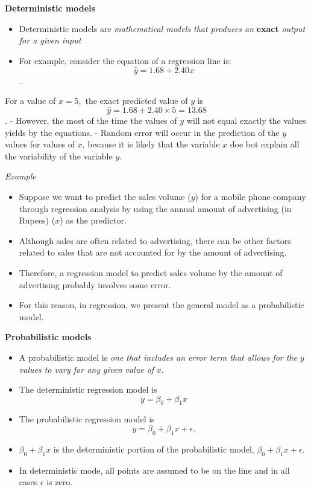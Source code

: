\documentclass[]{book}
\providecommand{\tightlist}{%
  \setlength{\itemsep}{0pt}\setlength{\parskip}{0pt}}
\begin{document}
\textbf{Deterministic models}

\begin{itemize}
\tightlist
\item
  Deterministic models are \emph{mathematical models that produces an} \textbf{exact} \emph{output for a given input}
\item
  For example, consider the equation of a regression line is:
  \[\hat{y} =1.68 + 2.40x\].
\end{itemize}

For a value of \(x=5,\) the exact predicted value of \(y\) is
\[\hat{y} =1.68 + 2.40\times 5 = 13.68\].
- However, the most of the time the values of \(y\) will not equal exactly the values yields by the equations.
- Random error will occur in the prediction of the \(y\) values for values of \(x\), because it is likely that the variable \(x\) doe bot explain all the variability of the variable \(y\).

\emph{Example}

\begin{itemize}
\tightlist
\item
  Suppose we want to predict the sales volume (\(y\)) for a mobile phone company through regression analysis by using the annual amount of advertising (in Rupees) (\(x\)) as the predictor.
\item
  Although sales are often related to advertising, there can be other factors related to sales that are not accounted for by the amount of advertising. 
\item
  Therefore, a regression model to predict sales volume by the amount of advertising probably involves some error.
\item
  For this reason, in regression, we present the general model as a probabilistic model.
\end{itemize}

\textbf{Probabilistic models}

\begin{itemize}
\item
  A probabilistic model is \emph{one that includes an error term that allows for the} \(y\) \emph{values to vary for any given value of} \(x\).
\item
  The deterministic regression model is
  \[y=\beta_0+\beta_1x\]
\item
  The probabilistic regression model is
  \[y=\beta_0+\beta_1x+\epsilon.\]
\item
  \(\beta_0+\beta_1x\) is the deterministic portion of the probabilistic model, \(\beta_0+\beta_1x+\epsilon.\)
\item
  In deterministic mode, all points are assumed to be on the line and in all cases \(\epsilon\) is zero.
\end{itemize}
\end{document}
